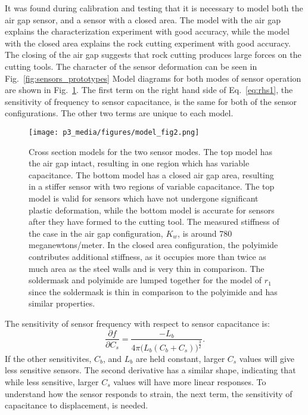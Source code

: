 It was found during calibration and
testing that it is necessary to model both the air gap sensor, and a sensor with a closed area.
The model with the air gap explains the characterization experiment with good accuracy, while the
model with the closed area explains the rock cutting experiment with good accuracy. 
The closing of the air gap suggests that rock cutting produces large forces on the cutting tools.
The character of the sensor deformation can be seen in Fig.~\ref{fig:sensors_prototypes}
Model diagrams for both modes of sensor operation are shown in Fig.~\ref{fig:sensors_models}.
The first term on the right hand side of Eq.~\ref{eq:rhs1}, the sensitivity of frequency to sensor capacitance, 
is the same for both of the sensor configurations. The other two terms are unique to each model.

\begin{figure}
\centering
\texttt{[image: p3\_media/figures/model\_fig2.png]}
\caption{Cross section models for the two sensor modes. The top model has the air gap intact, 
resulting in one region which has variable capacitance. The bottom model has a closed air gap area, 
resulting in a stiffer sensor with two regions of variable capacitance. The top model is valid 
for sensors which have not undergone significant plastic deformation, while the bottom 
model is accurate for sensors after they have formed to the cutting tool.
The measured stiffness of the case in the air gap configuration, $K_w$, 
is around 780 meganewtons/meter. 
In the closed area configuration, the polyimide contributes additional stiffness, as it
occupies more than twice as much area as the steel walls and is very thin in comparison.
The soldermask and polyimide are lumped together for the model of $r_1$ since the soldermask is
thin in comparison to the polyimide and has similar properties. 
}
\label{fig:sensors_models}
\end{figure}

The sensitivity of sensor frequency with respect to sensor capacitance is:
\begin{equation}
\frac{\partial f}{\partial C_s} = \frac {-L_b}{4 \pi \big(L_b(C_b + C_s)\big)^{\frac{3}{2}}}.
\end{equation}
If the other sensitivites, $C_b$, and $L_b$ are held constant,
larger $C_s$ values will give less sensitive sensors. 
The second derivative has a similar shape, indicating that while less sensitive, 
larger $C_s$ values will have more linear responses. To understand how the sensor
responds to strain, the next term, the sensitivity of capacitance to displacement, is needed.

